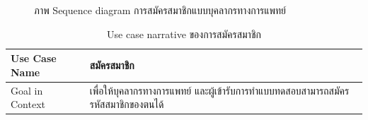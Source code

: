\documentclass[12pt,oneside,openright,a4paper]{cpe-thai-project}
\begin{document}
\begin{itemize}
\begin{figure}[!ht]
         \end{figure}
         \newpage
         \begin{figure}[!ht]\centering
          \setlength{\fboxrule}{0.2mm} %
          \setlength{\fboxsep}{1cm}
          \caption{ภาพ Sequence diagram การสมัครสมาชิกแบบบุคลากรทางการแพทย์}\label{fig:activity7}
         \end{figure}
         \newpage
         \begin{table}[!h]\centering
          \caption{Use case narrative ของการสมัครสมาชิก}\label{tbl:register}
          \begin{tabular}{|p{3cm}|p{12cm}|} \hline
          Use Case Name & สมัครสมาชิก \\ \hline
          Goal in Context & เพื่อให้บุคลากรทางการแพทย์ และผู้เข้ารับการทำแบบทดสอบสามารถสมัครรหัสสมาชิกของตนได้ \\ \hline

\end{tabular}
\end{table}
\end{itemize}
\end{document}
